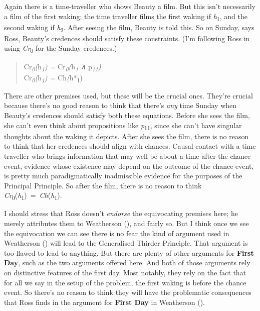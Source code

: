 \documentclass[
  11pt,
  letterpaper,
  DIV=11,
  numbers=noendperiod,
  twoside]{scrartcl}
\begin{document}
Again there is a time-traveller who shows Beauty a film. But this isn't
necessarily a film of the first waking; the time traveller films the
first waking if \emph{h}\textsubscript{1}, and the second waking if
\emph{h}\textsubscript{2}. After seeing the film, Beauty is told this.
So on Sunday, says Ross, Beauty's credences should satisfy these
constraints. (I'm following Ross in using \emph{Cr}\textsubscript{0} for
the Sunday credences.)

\begin{quote}
\noindent *Cr\emph{\textsubscript{0}(}h\emph{\textsubscript{1}) =
}Cr\emph{\textsubscript{0}(}h\emph{\textsubscript{1} ∧
}p\emph{\textsubscript{11})\\
}Cr\emph{\textsubscript{0}(}h\emph{\textsubscript{1}) =
}Ch\emph{(}h*\textsubscript{1})
\end{quote}

There are other premises used, but these will be the crucial ones.
They're crucial because there's no good reason to think that there's
\emph{any} time Sunday when Beauty's credences should satisfy both these
equations. Before she sees the film, she can't even think about
propositions like \emph{p}\textsubscript{11}, since she can't have
singular thoughts about the waking it depicts. After she sees the film,
there is no reason to think that her credences should align with
chances. Causal contact with a time traveller who brings information
that may well be about a time after the chance event, evidence whose
existence may depend on the outcome of the chance event, is pretty much
paradigmatically inadmissible evidence for the purposes of the Principal
Principle. So after the film, there is no reason to think
\emph{Cr}\textsubscript{0}(\emph{h}\textsubscript{1})~=~\emph{Ch}(\emph{h}\textsubscript{1}).

I should stress that Ross doesn't \emph{endorse} the equivocating
premises here; he merely attributes them to Weatherson
(), and fairly so. But I think once
we see the equivocation we can see there is no fear the kind of argument
used in Weatherson () will lead to
the Generalised Thirder Principle. That argument is too flawed to lead
to anything. But there are plenty of other arguments for \textbf{First
Day}, such as the two arguments offered here. And both of those
arguments rely on distinctive features of the first day. Most notably,
they rely on the fact that for all we say in the setup of the problem,
the first waking is before the chance event. So there's no reason to
think they will have the problematic consequences that Ross finds in the
argument for \textbf{First Day} in Weatherson
().
\end{document}

